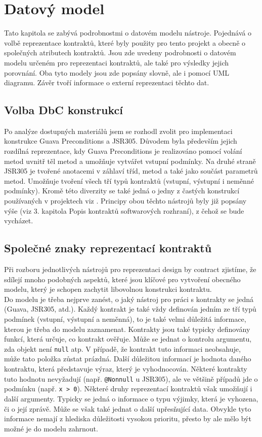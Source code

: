 \chapter{Datový model}
	Tato kapitola se zabývá podrobnostmi o datovém modelu nástroje. Pojednává o volbě reprezentace kontraktů, které byly použity pro tento projekt a obecně o společných atributech kontraktů. Jsou zde uvedeny podrobnosti o datovém modelu určeném pro reprezentaci kontraktů, ale také pro výsledky jejich porovnání. Oba tyto modely jsou zde popsány slovně, ale i pomocí UML diagramu. Závěr tvoří informace o externí reprezentaci těchto dat.


	\section{Volba DbC konstrukcí}
		Po analýze dostupných materiálů jsem se rozhodl zvolit pro implementaci konstrukce Guava Preconditions a JSR305. Důvodem byla především jejich rozdílná reprezentace, kdy Guava Preconditions je realizováno pomocí volání metod uvnitř těl metod a umožňuje vytvářet vstupní podmínky. Na druhé straně JSR305 je tvořené anotacemi v záhlaví tříd, metod a také jako součást parametrů metod. Umožňuje tvoření všech tří typů kontraktů (vstupní, výstupní i neměnné podmínky). Kromě této diverzity se také jedná o jedny z častých konstrukcí používaných v projektech viz \cite{contractsInWild}. Principy obou těchto nástrojů byly již popsány výše (viz 3. kapitola Popis kontraktů softwarových rozhraní), z čehož se bude vycházet.
				
				
	\section{Společné znaky reprezentací kontraktů}		
		Při rozboru jednotlivých nástrojů pro reprezentaci design by contract zjistíme, že sdílejí mnoho podobných aspektů, které jsou klíčové pro vytvoření obecného modelu, který je schopen zachytit libovolnou konstrukci kontraktu.\\ 
		
		Do modelu je třeba nejprve zanést, o jaký nástroj pro práci s kontrakty se jedná (Guava, JSR305, atd.). Každý kontrakt je také vždy definován jedním ze tří typů podmínek (vstupní, výstupní a neměnná), to je také velmi důležitá informace, kterou je třeba do modelu zaznamenat. Kontrakty jsou také typicky definovány funkcí, která určuje, co kontrakt ověřuje. Může se jednat o kontrolu argumentu, zda objekt není \texttt{null} atp. V případě, že kontrakt tuto informaci neobsahuje, může tato položka zůstat prázdná. Další důležitou informací je hodnota daného kontraktu, která představuje výraz, který je vyhodnocován. Některé kontrakty tuto hodnotu nevyžadují (např. \texttt{@Nonnull} u JSR305), ale ve většině případů jde o podmínku (např. \texttt{x > 0}). Některé druhy reprezentací kontraktů však umožňují i další argumenty. Typicky se jedná o informace o typu výjimky, která je vyhozena, či o její zprávě. Může se však také jednat o další upřesňující data. Obvykle tyto informace nemají z hlediska důležitosti vysokou prioritu, přesto by ale mělo být možné je do modelu zahrnout.
		
